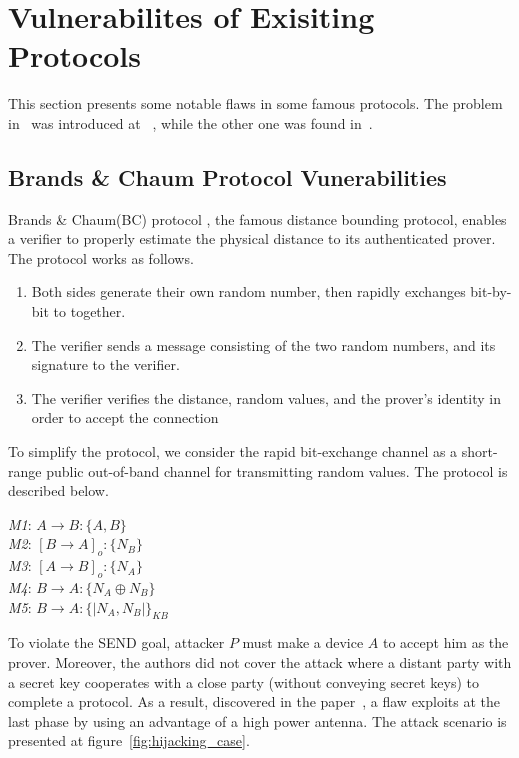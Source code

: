 \section{Vulnerabilites of Exisiting Protocols}

This section presents some notable flaws in some famous protocols. The problem in~\cite{Brands:1994aa} was introduced at ~\cite{6234408}, while the other one was found in~\cite{lin2006}. 

\subsection{Brands \& Chaum Protocol Vunerabilities}

Brands \& Chaum(BC) protocol \cite{Brands:1994aa}, the famous distance bounding protocol, enables a verifier to properly estimate the physical distance to its authenticated prover. The protocol works as follows.
\begin{enumerate}
\item Both sides generate their own random number, then rapidly exchanges bit-by-bit to together.
\item The verifier sends a message consisting of the two random numbers, and its signature to the verifier. 
\item The verifier verifies the distance, random values, and the prover's identity in order to accept the connection
\end{enumerate}

To simplify the protocol, we consider the rapid bit-exchange channel as a short-range public out-of-band channel for transmitting random values. The protocol is described below. 

\begin{center}
\begin{flushleft}
 \emph{M1}: $A \rightarrow B :\{A,B\}$ \\
\emph{M2}: $[B \rightarrow A]_o :\{N_B\}$ \\
\emph{M3}: $[A \rightarrow B]_o : \{N_A\}$\\
\emph{M4}: $B \rightarrow A :\{N_A \oplus N_B\}$ \\
\emph{M5}: $B \rightarrow A : \{|N_A,N_B|\}_{KB}$
\end{flushleft}
\end{center}

To violate the SEND goal, attacker $P$ must make a device $A$ to accept him as the prover. Moreover, the authors did not cover the attack where a distant party with a secret key cooperates with a close party (without conveying secret keys) to complete a protocol. As a result, discovered in the paper~\cite{6234408}, a flaw exploits at the last phase by using an advantage of a high power antenna. The attack scenario is presented at figure~\ref{fig:hijacking_case}. 

